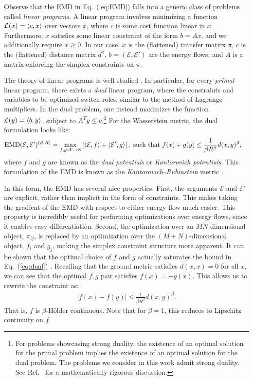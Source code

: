 \documentclass[letterpaper,11pt]{article}
\newcommand{\E}{\mathcal{E}}
\newcommand{\EMD}{\text{EMD}}
\DeclareRobustCommand{\Eq}[1]{Eq.~(\ref{eq:#1})}
\DeclareRobustCommand{\Refer}[1]{Ref.~\cite{#1}}
\begin{document}
Observe that the EMD in \Eq{EMD} falls into a generic class of problems called \emph{linear programs}. A linear program involves minimizing a function $\mathcal{L}(x) = \expval{c, x}$ over vectors $x$, where $c$ is some cost function linear in $x$. Furthermore, $x$ satisfies some linear constraint of the form $b = Ax$, and we additionally require $x \geq 0$. In our case, $x$ is the (flattened) transfer matrix $\pi$, $c$ is the (flattened) distance matrix $d^\beta$, $b = (\E, \E')$ are the energy flows, and $A$ is a matrix enforcing the simplex constraints on $\pi$. 

The theory of linear programs is well-studied \cite{gartner_06}. In particular, for every \emph{primal} linear program, there exists a \emph{dual} linear program, where the constraints and variables to be optimized switch roles, similar to the method of Lagrange multipliers. In the dual problem, one instead maximizes the function $\mathcal{L}(y) = \expval{b, y}$, subject to $A^T y \leq c$.\footnote{For problems showcasing strong duality, the existence of an optimal solution for the primal problem implies the existence of an optimal solution for the dual problem. The problems we consider in this work admit strong duality. See \Refer{Vilani_03} for a mathematically rigorous discussion.} For the Wasserstein metric, the dual formulation looks like:
%
\begin{align}
    \EMD(\E, \E')^{(\beta, R)} &= \max_{f,g:\mathcal{X}\to\mathbb{R}}\left[\expval{\E, f} + \expval{\E', g}\right], \text{ such that }f(x) + g(y) \leq \frac{1}{\beta R^\beta}d(x,y)^\beta, \label{eq:dual}
\end{align}
%
where $f$ and $g$ are known as the \emph{dual potentials} or \emph{Kantorovich potentials}. This formulation of the EMD is known as the \emph{Kantorovich–Rubinstein} metric \cite{Vilani_03}. 

In this form, the EMD has several nice properties. First, the arguments $\E$ and $\E'$ are explicit, rather than implicit in the form of constraints. This makes taking the gradient of the EMD with respect to either energy flow much easier. This property is incredibly useful for performing optimizations over energy flows, since it enables easy differentiation. Second, the optimization over an $MN$-dimensional object, $\pi_{ij}$, is replaced by an optimization over the $(M+N)$-dimensional object, $f_i$ and $g_j$, making the simplex constraint structure more apparent. It can be shown that the optimal choice of $f$ and $g$ actually saturates the bound in \Eq{dual} \cite{feydy_20}. Recalling that the ground metric satisfies $d(x,x) = 0$ for all $x$, we can see that the optimal $f, g$ pair satisfies $f(x) = - g(x)$. This allows us to rewrite the constraint as:
%
\begin{align}
    |f(x) - f(y)| \leq \frac{1}{\beta R^\beta}d(x,y)^\beta.
\end{align}
%
That is, $f$ is $\beta$-Hölder continuous. Note that for $\beta=1$, this reduces to Lipschitz continuity on $f$.  
\end{document}

